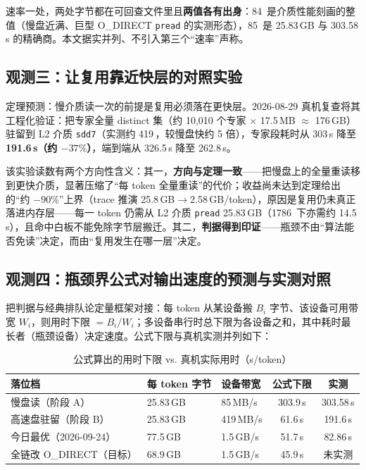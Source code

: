 \documentclass[11pt]{ctexart}
\begin{document}
速率一处，两处字节都在可回查文件里且\textbf{两值各有出身}：84\, 是介质性能刻画的整值（慢盘近满、巨型 O\_DIRECT \texttt{pread} 的实测形态），85\, 是 25.83\,GB 与 303.58\,s 的精确商。本文据实并列、不引入第三个“速率”声称。

\subsection{观测三：让复用靠近快层的对照实验}

定理预测：慢介质读一次的前提是复用必须落在更快层。2026-08-29 真机复查将其工程化验证：把专家全量 distinct 集（约 10,010 个专家 $\times$ 17.5\,MB $\approx$ 176\,GB）驻留到 L2 介质 \texttt{sdd7}（实测约 419\,，较慢盘快约 5 倍），专家段耗时从 303\,s 降至 \textbf{191.6\,s（约 $-37\%$）}，端到端从 326.5\,s 降至 262.8\,s。

该实验读数有两个方向性含义：其一，\textbf{方向与定理一致}——把慢盘上的全量重读移到更快介质，显著压缩了“每 token 全量重读”的代价；收益尚未达到定理给出的“约 $-90\%$”上界（trace 推演 25.8\,GB$\to$2.58\,GB/token），原因是复用仍未真正落进内存层——每一 token 仍需从 L2 介质 \texttt{pread} 25.83\,GB（1786\, 下亦需约 14.5\,s），且命中白板不能免除字节层搬迁。其二，\textbf{判据得到印证}——瓶颈不由“算法能否免读”决定，而由“复用发生在哪一层”决定。

\subsection{观测四：瓶颈界公式对输出速度的预测与实测对照}

把判据与经典排队论定量框架对接：每 token 从某设备搬 $B_i$ 字节、该设备可用带宽 $W_i$，则用时下限 $=B_i/W_i$；多设备串行时总下限为各设备之和，其中耗时最长者（瓶颈设备）决定速度\cite{little,denningbuzen,aba}。公式下限与真机实测并列如下：

\begin{table}[htbp]
\centering
\caption{公式算出的用时下限 vs. 真机实际用时（s/token）}
\label{tab:bottleneck}
\begin{tabular}{lllcc}
\toprule
落位档 & 每 token 字节 & 设备带宽 & 公式下限 & 实测 \\
\midrule
慢盘读（阶段 A） & 25.83\,GB & 85\,MB/s & 303.9\,s & 303.58\,s \\
高速盘驻留（阶段 B） & 25.83\,GB & 419\,MB/s & 61.6\,s & 191.6\,s \\
今日最优（2026-09-24） & 77.5\,GB & 1.5\,GB/s & 51.7\,s & 82.86\,s \\
全链改 O\_DIRECT（目标） & 68.9\,GB & 1.5\,GB/s & 45.9\,s & 未实测 \\
\bottomrule
\end{tabular}
\end{table}
\end{document}
